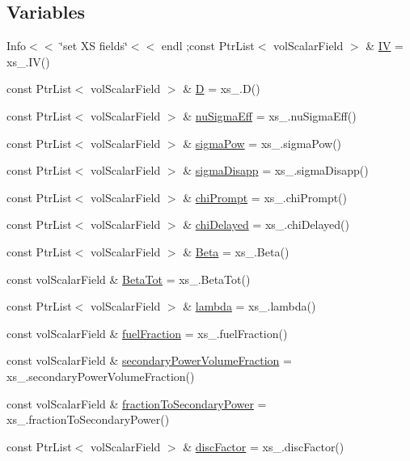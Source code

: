 \subsection*{Variables}
\begin{DoxyCompactItemize}
\item 
Info$<$$<$ \char`\"{}set XS fields\char`\"{}$<$$<$ endl ;const Ptr\+List$<$ vol\+Scalar\+Field $>$ \& \hyperlink{setXSFieldsSN_8H_a2e199f03a0c9f282f8e0db1dae0b20b4}{IV} = xs\+\_\+.\+IV()
\item 
const Ptr\+List$<$ vol\+Scalar\+Field $>$ \& \hyperlink{setXSFieldsSN_8H_a70ac93a527a85b4edf386830643d1561}{D} = xs\+\_\+.\+D()
\item 
const Ptr\+List$<$ vol\+Scalar\+Field $>$ \& \hyperlink{setXSFieldsSN_8H_aa603f5e77d24550aec5d6843a62d3707}{nu\+Sigma\+Eff} = xs\+\_\+.\+nu\+Sigma\+Eff()
\item 
const Ptr\+List$<$ vol\+Scalar\+Field $>$ \& \hyperlink{setXSFieldsSN_8H_ac04a1be049ae486d7c60fa591093c834}{sigma\+Pow} = xs\+\_\+.\+sigma\+Pow()
\item 
const Ptr\+List$<$ vol\+Scalar\+Field $>$ \& \hyperlink{setXSFieldsSN_8H_a26e2cc0a2f240dbf0b8888db0c8869e2}{sigma\+Disapp} = xs\+\_\+.\+sigma\+Disapp()
\item 
const Ptr\+List$<$ vol\+Scalar\+Field $>$ \& \hyperlink{setXSFieldsSN_8H_ae99cb941c26b8d02c30336ffe9d73cd2}{chi\+Prompt} = xs\+\_\+.\+chi\+Prompt()
\item 
const Ptr\+List$<$ vol\+Scalar\+Field $>$ \& \hyperlink{setXSFieldsSN_8H_a40cc7f7cbcb1b9e71096e95b125537c2}{chi\+Delayed} = xs\+\_\+.\+chi\+Delayed()
\item 
const Ptr\+List$<$ vol\+Scalar\+Field $>$ \& \hyperlink{setXSFieldsSN_8H_af87588a82c92b5a98302618c01213792}{Beta} = xs\+\_\+.\+Beta()
\item 
const vol\+Scalar\+Field \& \hyperlink{setXSFieldsSN_8H_a3ad4facb2dd0406d605dcb63190ce6f1}{Beta\+Tot} = xs\+\_\+.\+Beta\+Tot()
\item 
const Ptr\+List$<$ vol\+Scalar\+Field $>$ \& \hyperlink{setXSFieldsSN_8H_a5947916d2a53602ab94837afe65c23dd}{lambda} = xs\+\_\+.\+lambda()
\item 
const vol\+Scalar\+Field \& \hyperlink{setXSFieldsSN_8H_a470c39405a89f3faff1aaaec7855c71f}{fuel\+Fraction} = xs\+\_\+.\+fuel\+Fraction()
\item 
const vol\+Scalar\+Field \& \hyperlink{setXSFieldsSN_8H_a8a174336055259a9d6e186e9ceb2f629}{secondary\+Power\+Volume\+Fraction} = xs\+\_\+.\+secondary\+Power\+Volume\+Fraction()
\item 
const vol\+Scalar\+Field \& \hyperlink{setXSFieldsSN_8H_a333f327f48d6300db4dcab219afd7d02}{fraction\+To\+Secondary\+Power} = xs\+\_\+.\+fraction\+To\+Secondary\+Power()
\item 
const Ptr\+List$<$ vol\+Scalar\+Field $>$ \& \hyperlink{setXSFieldsSN_8H_aadc616dab27c2f3869b5259826f59f76}{disc\+Factor} = xs\+\_\+.\+disc\+Factor()
\end{DoxyCompactItemize}


